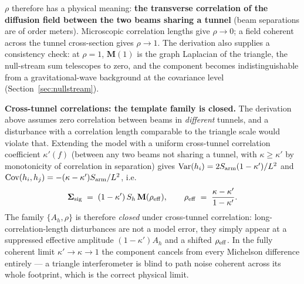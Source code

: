 \documentclass[11pt]{article}
\newcommand{\Ah}{A_h}
\newcommand{\Sh}{S_h}
\begin{document}
$\rho$ therefore has a physical meaning: \textbf{the transverse correlation of the diffusion field between the two beams sharing a tunnel} (beam separations are of order meters). Microscopic correlation lengths give $\rho \to 0$; a field coherent across the tunnel cross-section gives $\rho \to 1$. The derivation also supplies a consistency check: at $\rho = 1$, $\mathbf{M}(1)$ is the graph Laplacian of the triangle, the null-stream sum telescopes to zero, and the component becomes indistinguishable from a gravitational-wave background at the covariance level (Section~\ref{sec:nullstream}).

\textbf{Cross-tunnel correlations: the template family is closed.} The derivation above assumes zero correlation between beams in \emph{different} tunnels, and a disturbance with a correlation length comparable to the triangle scale would violate that. Extending the model with a uniform cross-tunnel correlation coefficient $\kappa'(f)$ (between any two beams not sharing a tunnel, with $\kappa \ge \kappa'$ by monotonicity of correlation in separation) gives $\mathrm{Var}(h_i) = 2S_{\rm arm}(1-\kappa')/L^2$ and $\mathrm{Cov}(h_i,h_j) = -(\kappa - \kappa')S_{\rm arm}/L^2$, i.e.
\begin{equation}
\bm{\Sigma}_{\rm sig} \;=\; (1-\kappa')\,\Sh\, \mathbf{M}(\rho_{\rm eff}),
\qquad
\rho_{\rm eff} \;=\; \frac{\kappa - \kappa'}{1 - \kappa'} .
\label{eq:crosstunnel}
\end{equation}
The family $\{\Ah, \rho\}$ is therefore \emph{closed} under cross-tunnel correlation: long-correlation-length disturbances are not a model error, they simply appear at a suppressed effective amplitude $(1-\kappa')\Ah$ and a shifted $\rho_{\rm eff}$. In the fully coherent limit $\kappa' \to \kappa \to 1$ the component cancels from every Michelson difference entirely --- a triangle interferometer is blind to path noise coherent across its whole footprint, which is the correct physical limit.
\end{document}
